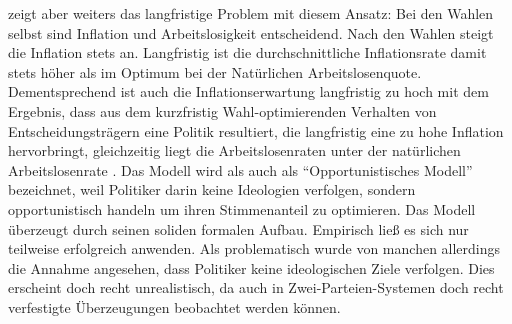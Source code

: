 \textcite{Nordhaus1975} zeigt aber weiters das langfristige Problem mit diesem Ansatz: Bei den Wahlen selbst sind Inflation und Arbeitslosigkeit entscheidend. Nach den Wahlen steigt die Inflation stets an. Langfristig ist die durchschnittliche Inflationsrate damit stets höher als im Optimum bei der Natürlichen Arbeitslosenquote. Dementsprechend ist auch die Inflationserwartung langfristig zu hoch mit dem Ergebnis, dass aus dem kurzfristig Wahl-optimierenden Verhalten von Entscheidungsträgern eine Politik resultiert, die langfristig eine zu hohe Inflation hervorbringt, gleichzeitig liegt die Arbeitslosenraten unter der natürlichen Arbeitslosenrate \parencite{Nordhaus1975}. 
Das Modell wird als auch als "`Opportunistisches Modell"' bezeichnet, weil Politiker darin keine Ideologien verfolgen, sondern opportunistisch handeln um ihren Stimmenanteil zu optimieren. Das Modell überzeugt durch seinen soliden formalen Aufbau. Empirisch ließ es sich nur teilweise erfolgreich anwenden. Als problematisch wurde von manchen allerdings die Annahme angesehen, dass Politiker keine ideologischen Ziele verfolgen. Dies erscheint doch recht unrealistisch, da auch in Zwei-Parteien-Systemen doch recht verfestigte Überzeugungen beobachtet werden können.

